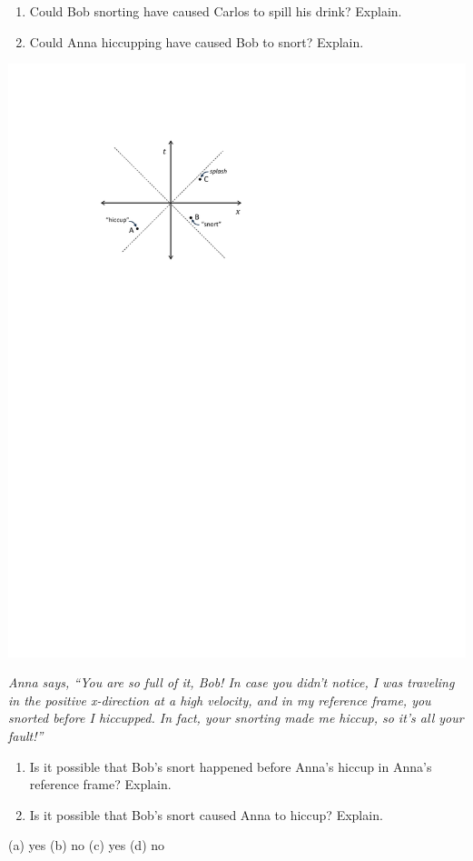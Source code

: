 \begin{Exercise}[difficulty=0]
\begin{minipage}{0.55 \textwidth}
\begin{enumerate}[nosep,label=(\alph*),series=mylist]
\item Could Bob snorting have caused Carlos to spill his drink?  Explain.
\item Could Anna hiccupping have caused Bob to snort? Explain.
\end{enumerate}
\end{minipage}
\begin{minipage}{0.44 \textwidth}
\hspace{\fill}\includegraphics{M_problems/velocities_causality/hiccup_snort_splash.pdf}

\end{minipage}
\textit{Anna says, ``You are so full of it, Bob!  In case you didn't notice, I was traveling in the positive x-direction at a high velocity, and in my reference frame, you snorted before I hiccupped.  In fact, your snorting made me hiccup, so it's all your fault!''}
\begin{enumerate}[resume*=mylist] 
\item Is it possible that Bob's snort happened before Anna's hiccup in Anna's reference frame? Explain.
\item Is it possible that Bob's snort caused Anna to hiccup?  Explain.
\end{enumerate}
\end{Exercise}
\begin{Answer}
(a) yes (b) no (c) yes (d) no
\end{Answer}


